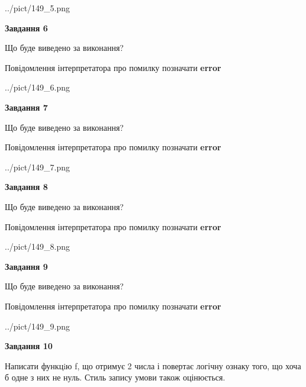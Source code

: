 \documentclass[12pt, ukrainian]{article}
\begin{document}
{\begin {large}
\begin{center}
	{../pict/149_5.png}
\end{center}
\newpage

{\begin {center}\textbf{Завдання 6}\end {center}}\par
Що буде виведено за виконання? \par
Повідомлення інтерпретатора про помилку позначати \textbf{error}

\begin{center}
	{../pict/149_6.png}
\end{center}
\newpage

{\begin {center}\textbf{Завдання 7}\end {center}}\par
Що буде виведено за виконання? \par
Повідомлення інтерпретатора про помилку позначати \textbf{error}

\begin{center}
	{../pict/149_7.png}
\end{center}
\newpage

{\begin {center}\textbf{Завдання 8}\end {center}}\par
Що буде виведено за виконання? \par
Повідомлення інтерпретатора про помилку позначати \textbf{error}

\begin{center}
	{../pict/149_8.png}
\end{center}
\newpage

{\begin {center}\textbf{Завдання 9}\end {center}}\par
Що буде виведено за виконання? \par
Повідомлення інтерпретатора про помилку позначати \textbf{error}

\begin{center}
	{../pict/149_9.png}
\end{center}
\newpage

{\begin {center}\textbf{Завдання 10}\end {center}}\par

Написати функцiю f, що отримує 2 числа і повертає логічну ознаку того, що хоча б одне з них не нуль. Стиль запису умови також оцінюється.\par
\newpage

\end {large}}
\end{document}
